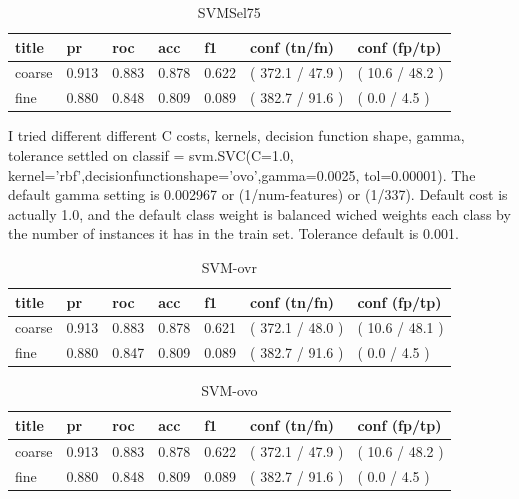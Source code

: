 \documentclass[ms]{nuthesis}
\begin{document}
\FloatBarrier
\begin{table}[h]
\centering
\begin{tabular}{|l||l||l||l||l||l||l|}\toprule
title & pr & roc & acc & f1 & conf (tn/fn) & conf (fp/tp) \\ \midrule
coarse & 0.913 & 0.883 & 0.878 & 0.622 & ( 372.1 / 47.9 ) & ( 10.6 / 48.2 ) \\
fine & 0.880 & 0.848 & 0.809 & 0.089 & ( 382.7 / 91.6 ) & ( 0.0 / 4.5 ) \\ \bottomrule
\end{tabular}
\caption{SVMSel75}
\label{tab:SVMSel75}
\end{table}
\FloatBarrier



\par I tried different different C costs, kernels, decision function shape, gamma, tolerance
settled on classif = svm.SVC(C=1.0, kernel='rbf',decisionfunctionshape='ovo',gamma=0.0025,
 tol=0.00001). The default gamma setting is 0.002967 or (1/num-features) or (1/337). Default
 cost is actually 1.0, and the default class weight is balanced wiched weights each class by
 the number of instances it has in the train set. Tolerance default is 0.001.


\FloatBarrier
\begin{table}[h]
\centering
\begin{tabular}{|l||l||l||l||l||l||l|}\toprule
title & pr & roc & acc & f1 & conf (tn/fn) & conf (fp/tp) \\ \midrule
coarse & 0.913 & 0.883 & 0.878 & 0.621 & ( 372.1 / 48.0 ) & ( 10.6 / 48.1 ) \\
fine & 0.880 & 0.847 & 0.809 & 0.089 & ( 382.7 / 91.6 ) & ( 0.0 / 4.5 ) \\ \bottomrule
\end{tabular}
\caption{SVM-ovr}
\label{tab:SVM-ovr}
\end{table}
\FloatBarrier


\FloatBarrier
\begin{table}[h]
\centering
\begin{tabular}{|l||l||l||l||l||l||l|}\toprule
title & pr & roc & acc & f1 & conf (tn/fn) & conf (fp/tp) \\ \midrule
coarse & 0.913 & 0.883 & 0.878 & 0.622 & ( 372.1 / 47.9 ) & ( 10.6 / 48.2 ) \\
fine & 0.880 & 0.848 & 0.809 & 0.089 & ( 382.7 / 91.6 ) & ( 0.0 / 4.5 ) \\ \bottomrule
\end{tabular}
\caption{SVM-ovo}
\label{tab:SVM-ovo}
\end{table}
\FloatBarrier
\end{document}
